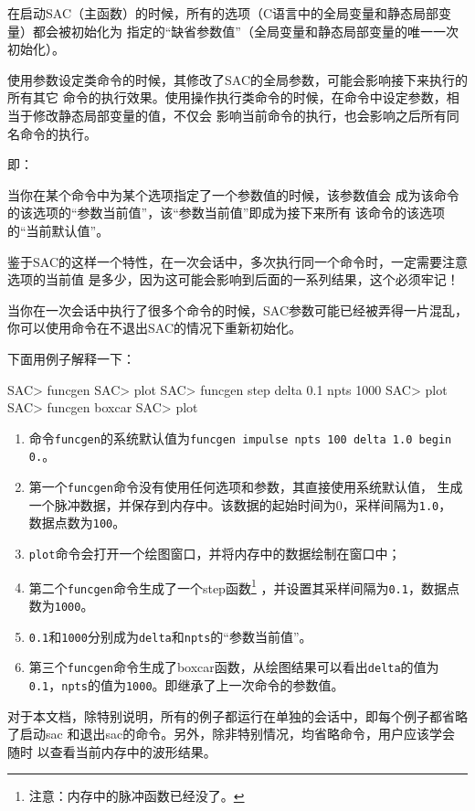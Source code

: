 在启动SAC（主函数）的时候，所有的选项（C语言中的全局变量和静态局部变量）都会被初始化为
指定的``缺省参数值''（全局变量和静态局部变量的唯一一次初始化）。

使用参数设定类命令的时候，其修改了SAC的全局参数，可能会影响接下来执行的所有其它
命令的执行效果。使用操作执行类命令的时候，在命令中设定参数，相当于修改静态局部变量的值，不仅会
影响当前命令的执行，也会影响之后所有同名命令的执行。

即：

当你在某个命令中为某个选项指定了一个参数值的时候，该参数值会
成为该命令的该选项的``参数当前值''，该``参数当前值''即成为接下来所有
该命令的该选项的``当前默认值''。

鉴于SAC的这样一个特性，在一次会话中，多次执行同一个命令时，一定需要注意选项的当前值
是多少，因为这可能会影响到后面的一系列结果，这个必须牢记！

当你在一次会话中执行了很多个命令的时候，SAC参数可能已经被弄得一片混乱，
你可以使用命令在不退出SAC的情况下重新初始化。

下面用例子解释一下：
\begin{SACCode}
SAC> funcgen
SAC> plot
SAC> funcgen step delta 0.1 npts 1000
SAC> plot
SAC> funcgen boxcar
SAC> plot
\end{SACCode}

\begin{enumerate}
\item 命令\lstinline{funcgen}的系统默认值为\lstinline{funcgen impulse npts 100 delta 1.0 begin 0.}。
\item 第一个\lstinline{funcgen}命令没有使用任何选项和参数，其直接使用系统默认值，
    生成一个脉冲数据，并保存到内存中。该数据的起始时间为0，采样间隔为\lstinline{1.0}，
    数据点数为\lstinline{100}。
\item \lstinline{plot}命令会打开一个绘图窗口，并将内存中的数据绘制在窗口中；
\item 第二个\lstinline{funcgen}命令生成了一个step函数\footnote{注意：内存中的脉冲函数已经没了。}
    ，并设置其采样间隔为\lstinline{0.1}，数据点数为\lstinline{1000}。
\item \lstinline{0.1}和\lstinline{1000}分别成为\lstinline{delta}和\lstinline{npts}的``参数当前值''。
\item 第三个\lstinline{funcgen}命令生成了boxcar函数，从绘图结果可以看出\lstinline{delta}的值为
    \lstinline{0.1}，\lstinline{npts}的值为\lstinline{1000}。即继承了上一次命令的参数值。
\end{enumerate}

对于本文档，除特别说明，所有的例子都运行在单独的会话中，即每个例子都省略了启动sac
和退出sac的命令。另外，除非特别情况，均省略命令，用户应该学会随时
以查看当前内存中的波形结果。
